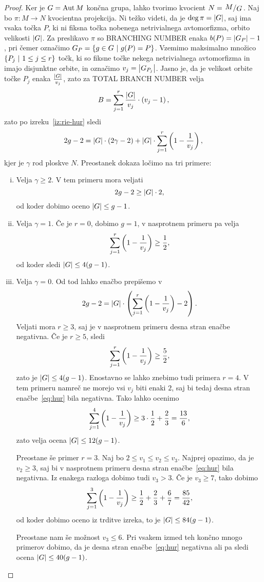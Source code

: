 \begin{proof}
Ker je $G = \operatorname{Aut} M$ končna grupa, lahko tvorimo kvocient
$N = \kvoc{M}{G}$. Naj bo $\pi \colon M \to N$ kvocientna
projekcija. Ni težko videti, da je $\deg \pi = \left\lvert G\right\rvert$, saj ima
vsaka točka $P$, ki ni fiksna točka nobenega netrivialnega
avtomorfizma, orbito velikosti $\left\lvert G\right\rvert$. Za preslikavo $\pi$ so
BRANCHING NUMBER enaka $b(P) = \left\lvert G_P\right\rvert - 1$, pri čemer označimo
$G_P = \left\{g \in G~\middle\vert~g(P) = P\right\}$. Vzemimo maksimalno množico
$\left\{P_j~\middle\vert~1 \leq j \leq r\right\}$ točk, ki so fiksne točke nekega
netrivialnega avtomorfizma in imajo disjunktne orbite, in označimo
$v_j = \left\lvert G_{P_j}\right\rvert$. Jasno je, da je velikost orbite točke $P_j$
enaka $\frac{\left\lvert G\right\rvert}{v_j}$, zato za TOTAL BRANCH NUMBER velja
\[
B = \sum_{j=1}^r \frac{\left\lvert G\right\rvert}{v_j} \cdot \left(v_j - 1\right),
\]
zato po izreku~\ref{iz:rie-hur} sledi
\[
2g - 2 = \left\lvert G\right\rvert \cdot (2 \gamma - 2) +
\left\lvert G\right\rvert \cdot \sum_{j=1}^r \left(1 - \frac{1}{v_j}\right),
\]
kjer je $\gamma$ rod ploskve $N$. Preostanek dokaza ločimo na tri
primere:

\begin{enumerate}[i)]
\item Velja $\gamma \geq 2$. V tem primeru mora veljati
\[
2g - 2 \geq \left\lvert G\right\rvert \cdot 2,
\]
od koder dobimo oceno $\left\lvert G\right\rvert \leq g-1$.

\item Velja $\gamma = 1$. Če je $r=0$, dobimo $g=1$, v nasprotnem
primeru pa velja
\[
\sum_{j=1}^r \left(1 - \frac{1}{v_j}\right) \geq \frac{1}{2},
\]
od koder sledi $\left\lvert G\right\rvert \leq 4(g-1)$.

\item Velja $\gamma = 0$. Od tod lahko enačbo prepišemo v
\begin{equation}\label{eq:hur}
2g - 2 =
\left\lvert G\right\rvert \cdot \left(\sum_{j=1}^r \left(1 - \frac{1}{v_j}\right) - 2\right).
\end{equation}
Veljati mora $r \geq 3$, saj je v nasprotnem primeru desna stran
enačbe negativna. Če je $r \geq 5$, sledi
\[
\sum_{j=1}^r \left(1 - \frac{1}{v_j}\right) \geq \frac{5}{2},
\]
zato je $\left\lvert G\right\rvert \leq 4(g-1)$. Enostavno se lahko znebimo tudi
primera $r=4$. V tem primeru namreč ne morejo vsi $v_j$ biti enaki
$2$, saj bi tedaj desna stran enačbe~\eqref{eq:hur} bila negativna.
Tako lahko ocenimo
\[
\sum_{j=1}^4 \left(1 - \frac{1}{v_j}\right) \geq
3 \cdot \frac{1}{2} + \frac{2}{3} =
\frac{13}{6},
\]
zato velja ocena $\left\lvert G\right\rvert \leq 12(g-1)$.

Preostane še primer $r=3$. Naj bo $2 \leq v_1 \leq v_2 \leq v_3$.
Najprej opazimo, da je $v_2 \geq 3$, saj bi v nasprotnem primeru
desna stran enačbe~\eqref{eq:hur} bila negativna. Iz enakega
razloga dobimo tudi $v_3 > 3$. Če je $v_3 \geq 7$, tako dobimo
\[
\sum_{j=1}^3 \left(1 - \frac{1}{v_j}\right) \geq
\frac{1}{2} + \frac{2}{3} + \frac{6}{7} = \frac{85}{42},
\]
od koder dobimo oceno iz trditve izreka, to je
$\left\lvert G\right\rvert \leq 84(g-1)$.

Preostane nam še možnost $v_3 \leq 6$. Pri vsakem izmed teh končno
mnogo primerov dobimo, da je desna stran enačbe~\eqref{eq:hur}
negativna ali pa sledi ocena $\left\lvert G\right\rvert \leq 40(g-1)$. \qedhere
\end{enumerate}
\end{proof}
